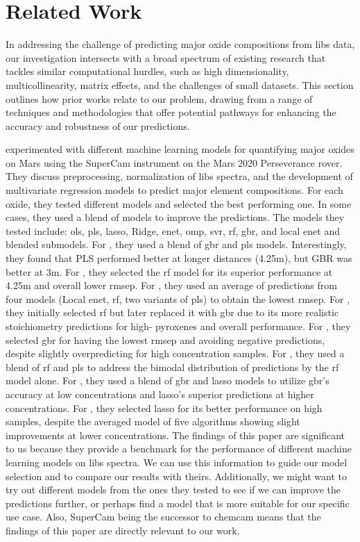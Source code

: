 \section{Related Work}
In addressing the challenge of predicting major oxide compositions from \gls{libs} data, our investigation intersects with a broad spectrum of existing research that tackles similar computational hurdles, such as high dimensionality, multicollinearity, matrix effects, and the challenges of small datasets.
This section outlines how prior works relate to our problem, drawing from a range of techniques and methodologies that offer potential pathways for enhancing the accuracy and robustness of our predictions.

\citet{andersonPostlandingMajorElement2022} experimented with different machine learning models for quantifying major oxides on Mars using the SuperCam instrument on the Mars 2020 Perseverance rover.
They discuss preprocessing, normalization of \gls{libs} spectra, and the development of multivariate regression models to predict major element compositions.
For each oxide, they tested different models and selected the best performing one.
In some cases, they used a blend of models to improve the predictions.
The models they tested include: \gls{ols}, \gls{pls}, \gls{lasso}, Ridge, \gls{enet}, \gls{omp}, \gls{svr}, \gls{rf}, \gls{gbr}, and local \gls{enet} and blended submodels.
For , they used a blend of \gls{gbr} and \gls{pls} models.
Interestingly, they found that PLS performed better at longer distances (4.25m), but GBR was better at 3m.
For , they selected the \gls{rf} model for its superior performance at 4.25m and overall lower \gls{rmsep}.
For , they used an average of predictions from four models (Local \gls{enet}, \gls{rf}, two variants of \gls{pls}) to obtain the lowest \gls{rmsep}.
For , they initially selected \gls{rf} but later replaced it with \gls{gbr} due to its more realistic stoichiometry predictions for high- pyroxenes and overall performance.
For , they selected \gls{gbr} for having the lowest \gls{rmsep} and avoiding negative predictions, despite slightly overpredicting  for high concentration samples.
For , they used a blend of \gls{rf} and \gls{pls} to address the bimodal distribution of  predictions by the \gls{rf} model alone.
For , they used a blend of \gls{gbr} and \gls{lasso} models to utilize \gls{gbr}'s accuracy at low concentrations and \gls{lasso}'s superior predictions at higher concentrations.
For , they selected \gls{lasso} for its better performance on high  samples, despite the averaged model of five algorithms showing slight improvements at lower concentrations.
The findings of this paper are significant to us because they provide a benchmark for the performance of different machine learning models on \gls{libs} spectra.
We can use this information to guide our model selection and to compare our results with theirs.
Additionally, we might want to try out different models from the ones they tested to see if we can improve the predictions further, or perhaps find a model that is more suitable for our specific use case.
Also, SuperCam being the successor to \gls{chemcam} means that the findings of this paper are directly relevant to our work.

